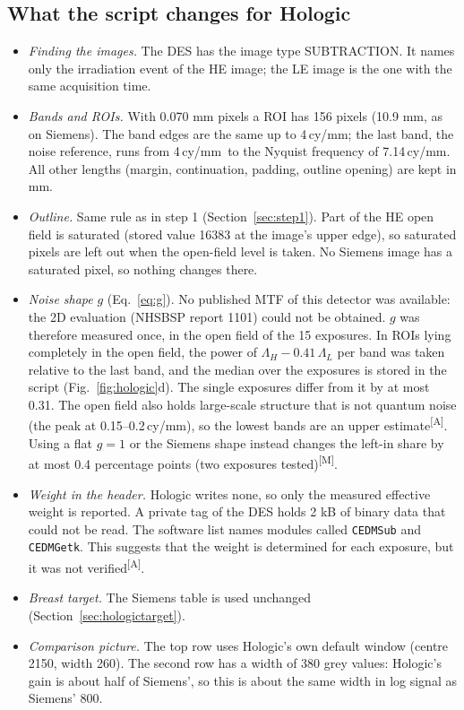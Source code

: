 \documentclass[11pt,a4paper]{article}
\newcommand{\LL}{\Lambda_L}
\newcommand{\LH}{\Lambda_H}
\newcommand{\M}{\textsuperscript{[M]}}
\newcommand{\As}{\textsuperscript{[A]}}
\newcommand{\cymm}{\,cy/mm}
\newcommand{\code}[1]{\texttt{#1}}
\begin{document}
\subsection{What the script changes for Hologic}\label{sec:hologicprofile}
\begin{itemize}
\item \emph{Finding the images.} The DES has the image type SUBTRACTION. It names only the irradiation event of
the HE image; the LE image is the one with the same acquisition time.
\item \emph{Bands and ROIs.} With 0.070 mm pixels a ROI has 156 pixels (10.9 mm, as on Siemens). The band edges are
the same up to 4\cymm; the last band, the noise reference, runs from 4\cymm\ to the Nyquist frequency of 7.14\cymm.
All other lengths (margin, continuation, padding, outline opening) are kept in mm.
\item \emph{Outline.} Same rule as in step 1 (Section~\ref{sec:step1}). Part of the HE open field is saturated (stored value
16383 at the image's upper edge), so saturated pixels are left out when the open-field level is taken. No Siemens
image has a saturated pixel, so nothing changes there.
\item \emph{Noise shape} $g$ (Eq.~\ref{eq:g}). No published MTF of this detector was available: the 2D evaluation
(NHSBSP report 1101) could not be obtained. $g$ was therefore measured once, in the open field of the 15
exposures. In ROIs lying completely in the open field, the power of $\LH-0.41\,\LL$ per band was taken relative to
the last band, and the median over the exposures is stored in the script (Fig.~\ref{fig:hologic}d). The single
exposures differ from it by at most 0.31. The open field also holds large-scale structure that is not quantum noise
(the peak at 0.15--0.2\cymm), so the lowest bands are an upper estimate\As. Using a flat $g=1$ or the Siemens shape instead changes the
left-in share by at most 0.4 percentage points (two exposures tested)\M.
\item \emph{Weight in the header.} Hologic writes none, so only the measured effective weight is reported. A private
tag of the DES holds 2 kB of binary data that could not be read. The software list names modules called
\code{CEDMSub} and \code{CEDMGetk}. This suggests that the weight is determined for each exposure, but it was not
verified\As.
\item \emph{Breast target.} The Siemens table is used unchanged (Section~\ref{sec:hologictarget}).
\item \emph{Comparison picture.} The top row uses Hologic's own default window (centre 2150, width 260). The second
row has a width of 380 grey values: Hologic's gain is about half of Siemens', so this is about the same width in log
signal as Siemens' 800.
\end{itemize}
\end{document}
